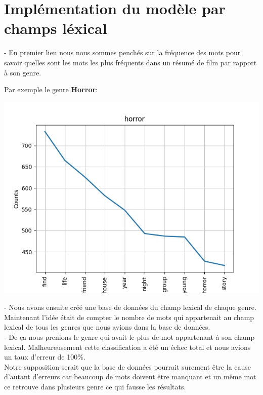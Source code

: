 \section{Implémentation du modèle par champs léxical}

- En premier lieu nous nous sommes penchés sur la fréquence des mots pour savoir quelles sont les mots les plus fréquents dans un résumé de film par rapport à son genre.

Par exemple le genre \textbf{Horror}: \\
\begin{center}
    \includegraphics[scale=.8]{graphs/horror .png}
\end{center}




- Nous avons ensuite créé une base de données du champ lexical de chaque genre.
Maintenant l'idée était de compter le nombre de mots qui appartenait au champ lexical de tous les genres que nous avions dans la base de données.\\
- De ça nous prenions le genre qui avait le plus de mot appartenant à son champ lexical.
Malheureusement cette classification a été un échec total et nous avions un taux d'erreur de 100\%. \\
Notre supposition serait que la base de données pourrait surement être la cause d’autant d’erreurs car beaucoup de mots doivent être manquant et un même mot ce retrouve dans plusieurs genre ce qui fausse les résultats.\\
